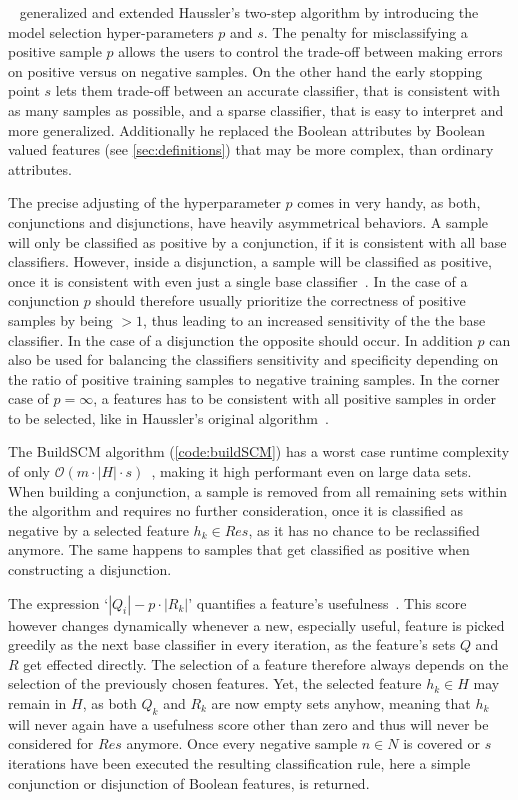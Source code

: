 ~\cite{marchand02} generalized and extended Haussler's two-step algorithm by introducing the model selection hyper-parameters \(p\) and \(s\).
The penalty for misclassifying a positive sample \(p\) allows the users to control the trade-off between making errors on positive versus on negative samples.
On the other hand the early stopping point \(s\) lets them trade-off between an accurate classifier,
that is consistent with as many samples as possible, and a sparse classifier, that is easy to interpret and more generalized.
Additionally he replaced the Boolean attributes by Boolean valued features (see \autoref{sec:definitions}) that may be more complex, than ordinary attributes. 

The precise adjusting of the hyperparameter \(p\) comes in very handy, as both, conjunctions and disjunctions, have heavily asymmetrical behaviors.
A sample will only be classified as positive by a conjunction, if it is consistent with all base classifiers.
However, inside a disjunction, a sample will be classified as positive, once it is consistent with even just a single base classifier~\cite{schmid}.
In the case of a conjunction \(p\) should therefore usually prioritize the correctness of positive samples by being \(> 1\),
thus leading to an increased sensitivity of the the base classifier.
In the case of a disjunction the opposite should occur.
In addition \(p\) can also be used for balancing the classifiers sensitivity and specificity
depending on the ratio of positive training samples to negative training samples.
In the corner case of \(p = \infty\), a features has to be consistent with all positive samples in order to be selected,
like in Haussler's original algorithm~\citep{kestler06}.

The BuildSCM algorithm (\autoref{code:buildSCM}) has a worst case runtime complexity of only \(\mathcal{O} (m \cdot |H| \cdot s)\)~\citep{drouin16},
making it high performant even on large data sets.
When building a conjunction, a sample is removed from all remaining sets within the algorithm and requires no further consideration,
once it is classified as negative by a selected feature \(h_k \in Res\), as it has no chance to be reclassified anymore.
The same happens to samples that get classified as positive when constructing a disjunction.

The expression `\(|Q_i| - p \cdot |R_k|\)' quantifies a feature's usefulness~\citep{marchand02}.
This score however changes dynamically whenever a new, especially useful, feature is picked greedily as the next base classifier in every iteration,
as the feature's sets \(Q\) and \(R\) get effected directly.
The selection of a feature therefore always depends on the selection of the previously chosen features.
Yet, the selected feature \(h_k \in H\) may remain in \(H\),
as both \(Q_k\) and \(R_k\) are now empty sets anyhow, meaning that \(h_k\) will never again
have a usefulness score other than zero and thus will never be considered for \(Res\) anymore.
Once every negative sample \(n \in N\) is covered or \(s\) iterations have been executed
the resulting classification rule, here a simple conjunction or disjunction of Boolean features, is returned.

